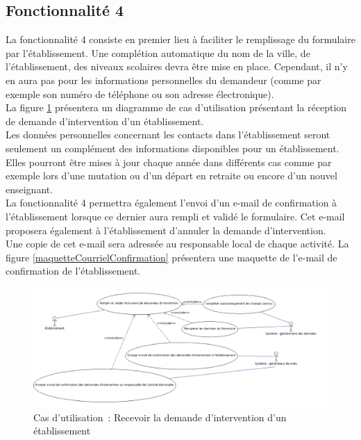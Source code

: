\newpage
\subsection{Fonctionnalité 4}
La fonctionnalité 4 consiste en premier lieu à faciliter le remplissage du formulaire par l'établissement. 
Une complétion automatique du nom de la ville, de l'établissement, des niveaux scolaires devra être mise en place. Cependant, il n'y en aura pas pour les informations personnelles du demandeur (comme  par exemple son numéro de téléphone ou son adresse électronique).\\
La figure \ref{recevoirDemandesDIntervention} présentera un diagramme de cas d'utilisation présentant la réception de demande d'intervention d'un établissement.\\
Les données personnelles concernant les contacts dans l'établissement seront seulement un complément des informations disponibles pour un établissement. Elles pourront être mises à jour chaque année dans différents cas comme par exemple lors d'une mutation ou d'un départ en retraite ou encore d'un nouvel enseignant.   \\

La fonctionnalité 4 permettra également l'envoi d'un e-mail de confirmation à l'établissement lorsque ce dernier aura rempli et validé le formulaire. Cet e-mail proposera également à l'établissement d'annuler la demande d'intervention. \\ Une copie de cet e-mail sera adressée au responsable local de chaque activité.
La figure \ref{maquetteCourrielConfirmation} présentera une maquette de l'e-mail de confirmation de l'établissement.\\
\begin{figure}[H]
	\centering
	\includegraphics[scale=0.4]{images/casDUtilisation/fonctionnalite4ReceptionIntervention.png}
	 \caption{Cas d'utilisation~: Recevoir la demande d'intervention d'un établissement}
	 \label{recevoirDemandesDIntervention}
\end{figure}

